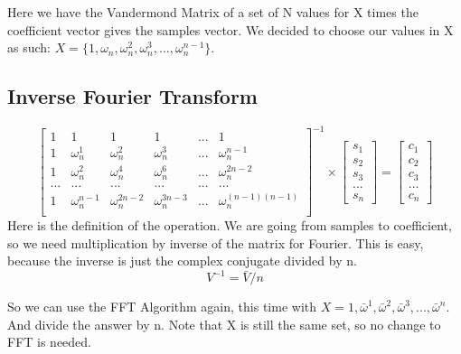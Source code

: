 Here we have the Vandermond Matrix of a set of N values for X times the coefficient vector gives the samples vector. We decided to choose our values in X as such:
$ X = \{ 1, \omega_n, \omega_n^2, \omega_n^3, ..., \omega_n^{n-1} \} $.

\subsection{Inverse Fourier Transform}

\begin{equation}
  \begin{bmatrix}
    1 & 1 & 1 & 1 & ... & 1 \\
    1 & \omega_n^1 & \omega_n^2 & \omega_n^3 & ... & \omega_n^{ n-1} \\
    1 & \omega_n^2 & \omega_n^4 & \omega_n^6 & ... & \omega_n^{2n-2} \\
    ... & ... & ... & ... & ... & ... \\
    1 & \omega_n^{n-1} & \omega_n^{2n-2} & \omega_n^{3n-3} & ... & \omega_n^{(n-1)(n-1)} \\
  \end{bmatrix} ^{-1} \times
  \begin{bmatrix}
    s_1 \\ s_2 \\ s_3 \\ ... \\ s_n
  \end{bmatrix} =
  \begin{bmatrix}
    c_1 \\ c_2 \\ c_3 \\ ... \\ c_n
  \end{bmatrix}
\end{equation}
Here is the definition of the operation. We are going from samples to coefficient, so we need multiplication by inverse of the matrix for Fourier. This is easy, because the inverse is just the complex conjugate divided by n.
\begin{equation}
  V^{-1} = \bar{V} / n
\end{equation}

So we can use the FFT Algorithm again, this time with $X = {1, \bar{\omega}^1, \bar{\omega}^2, \bar{\omega}^3, ..., \bar{\omega}^n}$. And divide the answer by n. Note that X is still the same set, so no change to FFT is needed.